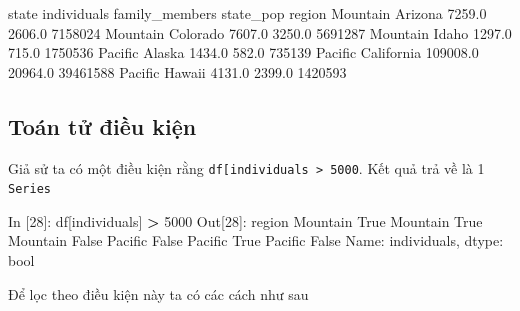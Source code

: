 \documentclass[
]{book}
\newenvironment{Shaded}{\begin{snugshade}}{\end{snugshade}}
\newcommand{\BuiltInTok}[1]{#1}
\newcommand{\DecValTok}[1]{\textcolor[rgb]{0.00,0.00,0.81}{#1}}
\newcommand{\FloatTok}[1]{\textcolor[rgb]{0.00,0.00,0.81}{#1}}
\newcommand{\NormalTok}[1]{#1}
\newcommand{\OperatorTok}[1]{\textcolor[rgb]{0.81,0.36,0.00}{\textbf{#1}}}
\newcommand{\StringTok}[1]{\textcolor[rgb]{0.31,0.60,0.02}{#1}}
\newcommand{\VariableTok}[1]{\textcolor[rgb]{0.00,0.00,0.00}{#1}}
\begin{document}
\begin{Shaded}
\begin{Highlighting}[]
\NormalTok{               state  individuals  family\_members  state\_pop}
\NormalTok{region                                                      }
\NormalTok{Mountain     Arizona       }\FloatTok{7259.0}          \FloatTok{2606.0}    \DecValTok{7158024}
\NormalTok{Mountain    Colorado       }\FloatTok{7607.0}          \FloatTok{3250.0}    \DecValTok{5691287}
\NormalTok{Mountain       Idaho       }\FloatTok{1297.0}           \FloatTok{715.0}    \DecValTok{1750536}
\NormalTok{Pacific       Alaska       }\FloatTok{1434.0}           \FloatTok{582.0}     \DecValTok{735139}
\NormalTok{Pacific   California     }\FloatTok{109008.0}         \FloatTok{20964.0}   \DecValTok{39461588}
\NormalTok{Pacific       Hawaii       }\FloatTok{4131.0}          \FloatTok{2399.0}    \DecValTok{1420593}
\end{Highlighting}
\end{Shaded}

\hypertarget{touxe1n-tux1eed-ux111iux1ec1u-kiux1ec7n}{%
\subsection{Toán tử điều kiện}\label{touxe1n-tux1eed-ux111iux1ec1u-kiux1ec7n}}

Giả sử ta có một điều kiện rằng \texttt{df{[}\textquotesingle{}individuals\textquotesingle{}{]}\ \textgreater{}\ 5000}. Kết quả trả về là 1 \texttt{Series}

\begin{Shaded}
\begin{Highlighting}[]
\NormalTok{In [}\DecValTok{28}\NormalTok{]: df[}\StringTok{\textquotesingle{}individuals\textquotesingle{}}\NormalTok{] }\OperatorTok{\textgreater{}} \DecValTok{5000}
\NormalTok{Out[}\DecValTok{28}\NormalTok{]:}
\NormalTok{region}
\NormalTok{Mountain     }\VariableTok{True}
\NormalTok{Mountain     }\VariableTok{True}
\NormalTok{Mountain    }\VariableTok{False}
\NormalTok{Pacific     }\VariableTok{False}
\NormalTok{Pacific      }\VariableTok{True}
\NormalTok{Pacific     }\VariableTok{False}
\NormalTok{Name: individuals, dtype: }\BuiltInTok{bool}
\end{Highlighting}
\end{Shaded}

Để lọc theo điều kiện này ta có các cách như sau
\end{document}
